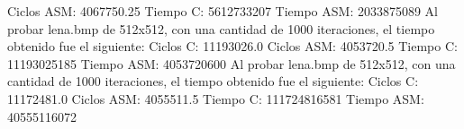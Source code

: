 \documentclass[10pt, a4paper]{article}
\begin{document}
\begin{itemize}
Ciclos ASM:               4067750.25\newline
\newline
Tiempo C:                 5612733207\newline
Tiempo ASM:               2033875089\newline
\newline
Al probar lena.bmp de 512x512, con una cantidad de 1000 iteraciones, el tiempo obtenido fue el siguiente:\newline
Ciclos C:                 11193026.0\newline
Ciclos ASM:               4053720.5\newline
\newline
Tiempo C:                 11193025185\newline
Tiempo ASM:               4053720600\newline
\newline
Al probar lena.bmp de 512x512, con una cantidad de 1000 iteraciones, el tiempo obtenido fue el siguiente:\newline
Ciclos C:                 11172481.0\newline
Ciclos ASM:               4055511.5\newline
\newline
Tiempo C:                 111724816581\newline
Tiempo ASM:               40555116072\newline

\end{itemize}
\end{document}
